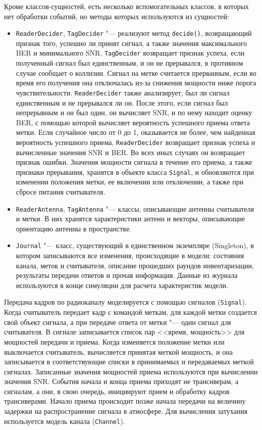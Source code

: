 Кроме классов-сущностей, есть несколько вспомогательных классов, в которых нет обработки событий, но методы которых используются из сущностей: 

\begin{itemize}
	\item \texttt{ReaderDecider}, \texttt{TagDecider} "--- реализуют метод \texttt{decide()}, возвращающий признак того, успешно ли принят сигнал, а также значения максимального BER и минимального SNR. \texttt{TagDecider} возвращает признак успеха, если полученный сигнал был единственным, и он не прерывался, в противном случае сообщает о коллизии. Сигнал на метке считается прерванным, если во время его получения она отключалась из-за снижения мощности ниже порога чувствительности. \texttt{ReaderDecider} также анализирует, был ли сигнал единственным и не прерывался ли он. После этого, если сигнал был непрерывным и он был один, он вычисляет SNR, и по нему находит оценку BER, с помощью которой вычисляет вероятность успешного приема ответа метки. Если случайное число от 0 до 1, оказывается не более, чем найденная вероятность успешного приема, \texttt{ReaderDecider} возвращает признак успеха и вычисленные значения SNR и BER. Во всех иных случаях он возвращает признак ошибки. Значения мощности сигнала в течение его приема, а также признаки прерывания, хранятся в объекте класса \texttt{Signal}, и обновляются при изменении положения метки, ее включении или отключении, а также при сбросе питания считывателя.
	\item \texttt{ReaderAntenna}, \texttt{TagAntenna} "--- классы, описывающие антенны считывателя и метки. В них хранятся характеристики антенн и векторы, описывающие ориентацию антенны в пространстве.
	\item \texttt{Journal} "--- класс, существующий в единственном экземпляре (Singleton), в котором записываются все изменения, происходящие в модели: состояния канала, меток и считывателя, описание прошедших раундов инвентаризации, результаты передачи ответов и прочая информация. Данные из журнала используются в конце симуляции для расчета характеристик модели.
\end{itemize}

Передача кадров по радиоканалу моделируется с помощью сигналов (\texttt{Signal}). Когда считыватель передает кадр с командой меткам, для каждой метки создается свой объект сигнала, а при передаче ответа от метки "--- один сигнал для считывателя. В сигнале записывается список пар <<время, мощность>> для мощностей передачи и приема. Когда изменяется положение метки или выключается считыватель, вычисляется принятая меткой мощность, и она записывается в соответствующие списки в принимаемых и передаваемых меткой сигналах. Записанные значения мощностей приема используются при вычислении значения SNR. События начала и конца приема приходят не трансиверам, а сигналам, а они, в свою очередь, инициируют прием и обработку кадров трансиверами. Начало приема происходит позже начала передачи на величину задержки на распространение сигнала в атмосфере. Для вычисления затухания используется модель канала (\texttt{Channel}). 

